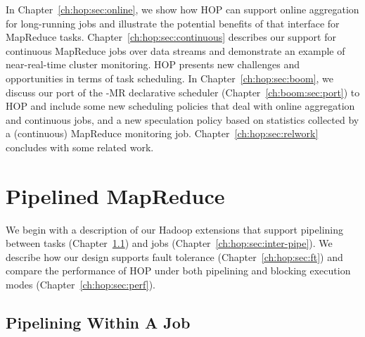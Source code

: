 In Chapter~\ref{ch:hop:sec:online}, we show how HOP can support online
aggregation for long-running jobs and illustrate the potential benefits of that
interface for MapReduce tasks.  Chapter~\ref{ch:hop:sec:continuous} describes
our support for continuous MapReduce jobs over data streams and demonstrate an
example of near-real-time cluster monitoring.  HOP presents new challenges and
opportunities in terms of task scheduling.  In Chapter~\ref{ch:hop:sec:boom},
we discuss our port of the \BOOM-MR declarative scheduler
(Chapter~\ref{ch:boom:sec:port}) to HOP and include some new \OVERLOG
scheduling policies that deal with online aggregation and continuous jobs, and
a new speculation policy based on statistics collected by a (continuous)
MapReduce monitoring job.  Chapter~\ref{ch:hop:sec:relwork} concludes with some
related work.

\section{Pipelined MapReduce}
\label{ch:hop:sec:pipelining}

We begin with a description of our Hadoop extensions that support pipelining
between tasks (Chapter~\ref{ch:hop:sec:intra-pipe}) and jobs
(Chapter~\ref{ch:hop:sec:inter-pipe}).  We describe how our design supports
fault tolerance (Chapter~\ref{ch:hop:sec:ft}) and compare the performance of HOP
under both pipelining and blocking execution modes
(Chapter~\ref{ch:hop:sec:perf}).


\subsection{Pipelining Within A Job}
\label{ch:hop:sec:intra-pipe}

